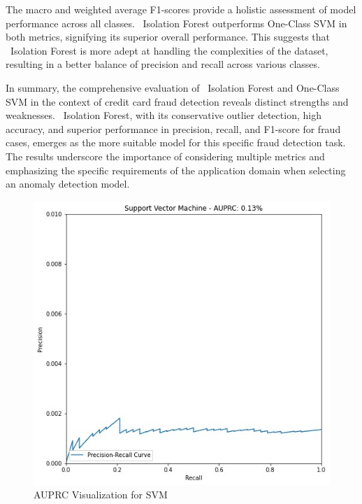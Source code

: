 \documentclass[journal]{IEEEtran}
\begin{document}
The macro and weighted average F1-scores provide a holistic assessment of model performance across all classes. ~Isolation Forest outperforms One-Class SVM in both metrics, signifying its superior overall performance. This suggests that ~Isolation Forest is more adept at handling the complexities of the dataset, resulting in a better balance of precision and recall across various classes.

In summary, the comprehensive evaluation of ~Isolation Forest and One-Class SVM in the context of credit card fraud detection reveals distinct strengths and weaknesses. ~Isolation Forest, with its conservative outlier detection, high accuracy, and superior performance in precision, recall, and F1-score for fraud cases, emerges as the more suitable model for this specific fraud detection task. The results underscore the importance of considering multiple metrics and emphasizing the specific requirements of the application domain when selecting an anomaly detection model.

\begin{figure}[h]
    \centering
    \includegraphics[width=0.8\linewidth]{AUPRC.jpg}
    \caption{AUPRC Visualization for SVM}
    \label{fig:svm}
\end{figure}
\end{document}
